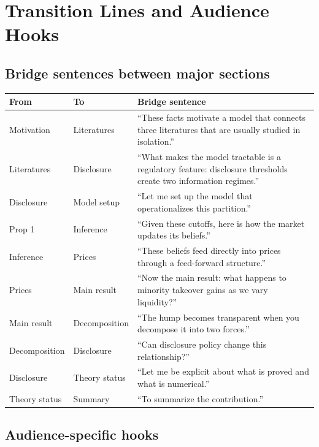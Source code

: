 \documentclass[9pt,a4paper]{extarticle}
\begin{document}
\section{Transition Lines and Audience Hooks}

\subsection{Bridge sentences between major sections}

{\footnotesize
\begin{tabularx}{\textwidth}{@{}P{0.16\textwidth}P{0.16\textwidth}Y@{}}
\toprule
\textbf{From} & \textbf{To} & \textbf{Bridge sentence} \\
\midrule
Motivation & Literatures & ``These facts motivate a model that connects three literatures that are usually studied in isolation.'' \\
Literatures & Disclosure & ``What makes the model tractable is a regulatory feature: disclosure thresholds create two information regimes.'' \\
Disclosure & Model setup & ``Let me set up the model that operationalizes this partition.'' \\
Prop 1 & Inference & ``Given these cutoffs, here is how the market updates its beliefs.'' \\
Inference & Prices & ``These beliefs feed directly into prices through a feed-forward structure.'' \\
Prices & Main result & ``Now the main result: what happens to minority takeover gains as we vary liquidity?'' \\
Main result & Decomposition & ``The hump becomes transparent when you decompose it into two forces.'' \\
Decomposition & Disclosure & ``Can disclosure policy change this relationship?'' \\
Disclosure & Theory status & ``Let me be explicit about what is proved and what is numerical.'' \\
Theory status & Summary & ``To summarize the contribution.'' \\
\bottomrule
\end{tabularx}
}

\subsection{Audience-specific hooks}
\end{document}
